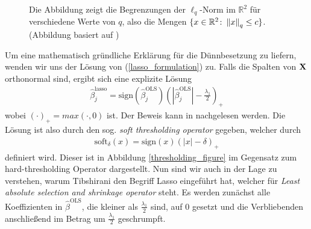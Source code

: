 \begin{figure}
\caption{Die Abbildung zeigt die Begrenzungen der $\ell_q$-Norm im $\mathbb{R}^2$ für verschiedene Werte von $q$, also die Mengen $\{x \in \mathbb{R}^2 \colon \left\lVert x \right\rVert_{q} \leq c \}$. (Abbildung basiert auf \cite{hastie_elements})}
\label{norm_figure}
\end{figure}

Um eine mathematisch gründliche Erklärung für die Dünnbesetzung zu liefern, wenden wir uns der Lösung von (\ref{lasso_formulation}) zu. Falls die Spalten von $\mathbf{X}$ orthonormal sind, ergibt sich eine explizite Lösung
\begin{align}
\hat{\beta}_j^{\text{lasso}} = \text{sign}(\hat{\beta}_j^{\text{OLS}}) \left(\left|\hat{\beta}_j^{\text{OLS}}\right| - \frac{\lambda_1}{2}\right)_{+}
\end{align}
wobei $(\cdot)_+ = max(\cdot, 0)$ ist. Der Beweis kann in \cite{murphy} nachgelesen werden. Die Lösung ist also durch den sog. \textit{soft thresholding operator} gegeben, welcher durch
\begin{align}
\text{soft}_{\delta}(x) = \text{sign}(x)(|x| - \delta)_+
\end{align}
definiert wird. Dieser ist in Abbildung \ref{thresholding_figure} im Gegensatz zum hard-thresholding Operator dargestellt. Nun sind wir auch in der Lage zu verstehen, warum Tibshirani \cite{tibshirani_lasso} den Begriff Lasso eingeführt hat, welcher für \textit{Least absolute selection and shrinkage operator} steht. Es werden zunächst alle Koeffizienten in $\hat{\beta}^{\text{OLS}}$, die kleiner als $\frac{\lambda_1}{2}$ sind, auf $0$ gesetzt und die Verbliebenden anschließend im Betrag um $\frac{\lambda_1}{2}$ geschrumpft. 

